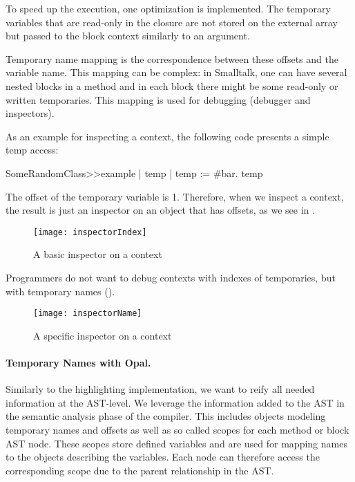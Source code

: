 \documentclass[preprint,10pt]{sigplanconf}
\begin{document}
To speed up the execution, one optimization is implemented. The temporary variables that are read-only in the closure are not stored on the external array but passed to the block context similarly to an argument. 

Temporary name mapping is the correspondence between these offsets and the variable name. This mapping can be complex: in Smalltalk, one can have several nested blocks in a method and in each block there might be some read-only or written temporaries. This mapping is used for debugging (debugger and inspectors).

As an example for inspecting a context, the following code presents a simple temp access:

\begin{code}{}
SomeRandomClass>>example
        | temp |
        temp := #bar.
        \ret temp
\end{code}

The offset of the temporary variable  is 1. Therefore, when we inspect a context, the result is just an inspector on an object that has offsets, as we see in .

\begin{figure}[ht]
\begin{center}
	\texttt{[image: inspectorIndex]}
	\caption{A basic inspector on a context}
\end{center}
\end{figure}

Programmers do not want to debug contexts with indexes of temporaries, but with temporary names (). 
\begin{figure}[ht]
\begin{center}
	\texttt{[image: inspectorName]}
	\caption{A specific inspector on a context}
\end{center}
\end{figure}

\paragraph{Temporary Names with Opal.}

Similarly to the highlighting implementation, we want to reify all needed information at the AST-level. We leverage the information added to the AST in the semantic analysis phase of the compiler.
This includes objects modeling temporary names and offsets as well as so called scopes for each method or block AST node. These scopes store defined variables and are used for mapping names to the objects describing the variables. Each node can therefore access the corresponding scope due to the parent relationship in the AST. 
\end{document}

